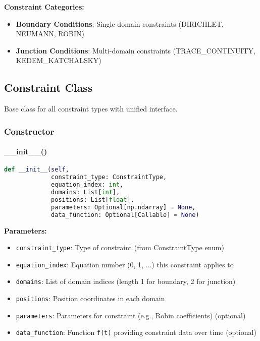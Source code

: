\textbf{Constraint Categories:}
\begin{itemize}
    \item \textbf{Boundary Conditions}: Single domain constraints (DIRICHLET, NEUMANN, ROBIN)
    \item \textbf{Junction Conditions}: Multi-domain constraints (TRACE\_CONTINUITY, KEDEM\_KATCHALSKY)
\end{itemize}

\subsection{Constraint Class}
\label{subsec:constraint_class}

Base class for all constraint types with unified interface.

\subsubsection{Constructor}

\paragraph{\_\_init\_\_()}\leavevmode
\begin{lstlisting}[language=Python, caption=Constraint Constructor]
def __init__(self, 
             constraint_type: ConstraintType,
             equation_index: int,
             domains: List[int],
             positions: List[float],
             parameters: Optional[np.ndarray] = None,
             data_function: Optional[Callable] = None)
\end{lstlisting}

\textbf{Parameters:}
\begin{itemize}
    \item \texttt{constraint\_type}: Type of constraint (from ConstraintType enum)
    \item \texttt{equation\_index}: Equation number (0, 1, ...) this constraint applies to
    \item \texttt{domains}: List of domain indices (length 1 for boundary, 2 for junction)
    \item \texttt{positions}: Position coordinates in each domain
    \item \texttt{parameters}: Parameters for constraint (e.g., Robin coefficients) (optional)
    \item \texttt{data\_function}: Function \texttt{f(t)} providing constraint data over time (optional)
\end{itemize}

